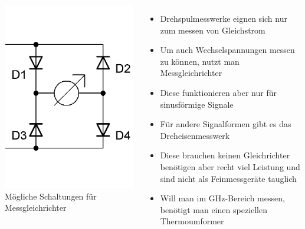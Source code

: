 \begin{frame}
\begin{columns}
\begin{center}
      \includegraphics[width=\textwidth,height=.4\textheight,keepaspectratio]{a16/Messgleichrichter2.png}\\
      {\tiny Mögliche Schaltungen für Messgleichrichter}
    \end{center}
    \begin{itemize}
      \item Drehspulmesswerke eignen sich nur zum messen von Gleichstrom
      \item Um auch Wechselspannungen messen zu können, nutzt man Messgleichrichter
      \item Diese funktionieren aber nur für sinusförmige Signale
      \item Für andere Signalformen gibt es das Dreheisenmesswerk
      \item Diese brauchen keinen Gleichrichter benötigen aber recht viel Leistung und sind nicht als Feinmessgeräte tauglich
      \item Will man im GHz-Bereich messen, benötigt man einen speziellen Thermoumformer
    \end{itemize}
  \end{columns}
\end{frame}

